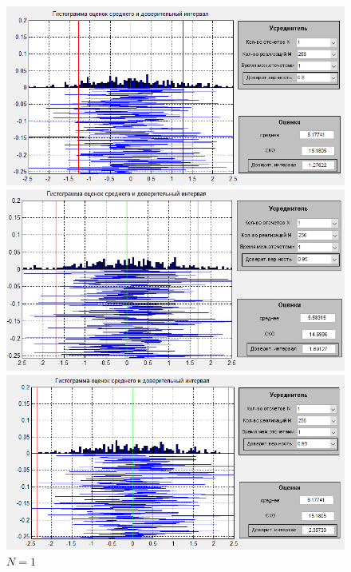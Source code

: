  \begin{figure}[H]
	\begin{minipage}{0.3\linewidth}
		\centering
        \includegraphics[width=\linewidth]{fig/realize_b1N1}
		\caption*{$\beta =0.8$}
	\end{minipage}
	\begin{minipage}{0.3\linewidth}
		\centering
        \includegraphics[width=\linewidth]{fig/realize_b2N1}
		\caption*{$\beta =0.95$}
	\end{minipage}
	\begin{minipage}{0.3\linewidth}
		\centering
        \includegraphics[width=\linewidth]{fig/realize_b3N1}
		\caption*{$\beta =0.98$}
	\end{minipage}
\caption*{$N=1$}
\end{figure}

